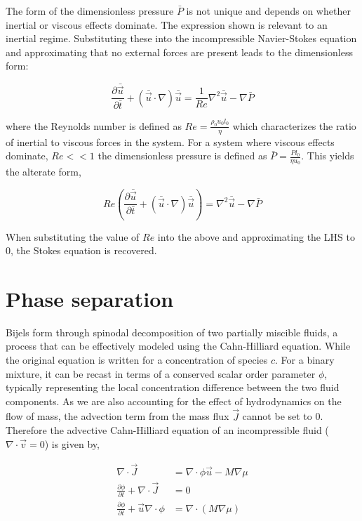 The form of the dimensionless pressure $\bar{P}$ is not unique and depends on whether inertial or viscous effects dominate. The expression shown is 
relevant to an inertial regime. Substituting these into the incompressible Navier-Stokes equation and approximating that no external forces are present 
leads to the dimensionless form:

\begin{equation}
    \frac{\partial \bar{\vec{u}}}{\partial \bar{t}} + (\bar{\vec{u}} \cdot\nabla)\bar{\vec{u}} = \frac{1}{Re} \nabla^2 \bar{\vec{u}} - \nabla\bar{P}
\end{equation}

where the Reynolds number is defined as $Re = \frac{\rho_0 u_0 l_0}{\eta}$ which characterizes the ratio of inertial to viscous forces in the system. For a system
where viscous effects dominate, $Re << 1$ the dimensionless pressure is defined as $\bar{P} = \frac{P l_0}{\eta u_0}$. This yields the alterate form,

\begin{equation}
    Re\left( \frac{\partial \bar{\vec{u}}}{\partial \bar{t}} + (\bar{\vec{u}} \cdot\nabla)\bar{\vec{u}}  \right) = \nabla^2 \bar{\vec{u}} - \nabla\bar{P}
\end{equation}

When substituting the value of $Re$ into the above and approximating the LHS to 0, the Stokes equation is recovered.

\section{Phase separation}

Bijels form through spinodal decomposition of two partially miscible fluids, a process that can be effectively modeled using the Cahn-Hilliard equation. \cite{cahn_spinodal_1961} While the
original equation is written for a concentration of species $c$. For a binary mixture, it can be recast in terms of a conserved scalar order parameter $\phi$, typically representing the 
local concentration difference between the two fluid components. As we are also accounting for the effect of hydrodynamics on the flow of mass, the advection term
from the mass flux $\vec{J}$ cannot be set to 0. Therefore the advective Cahn-Hilliard equation of an incompressible fluid ($\nabla \cdot \vec{v} = 0$) is given by,

\begin{equation}
    \begin{split}
        \nabla \cdot \vec{J} &= \nabla \cdot \phi\vec{u} - M \nabla \mu \\
        \frac{\partial \phi}{\partial t} + \nabla \cdot \vec{J} &= 0 \\
        \frac{\partial \phi}{\partial t} + \vec{u}\nabla \cdot \phi &= \nabla \cdot \left( M \nabla \mu \right)
    \end{split}
\end{equation}

